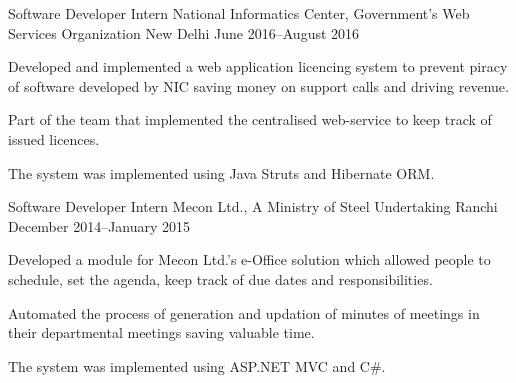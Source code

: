 
\begin{cventries}

\cventry%
  {Software Developer Intern} %
  {National Informatics Center, Government's Web Services Organization} %
  {New Delhi} %
  {June 2016--August 2016} %
  {%
    \begin{cvitems} %
      \item{Developed and implemented a web application licencing system to
            prevent piracy of software developed by NIC saving money on support
            calls and driving revenue.}
      \item{Part of the team that implemented the centralised web-service to
            keep track of issued licences.}
      \item{The system was implemented using Java Struts and Hibernate ORM.}
    \end{cvitems}
  }

\cventry%
  {Software Developer Intern} %
  {Mecon Ltd., A Ministry of Steel Undertaking} %
  {Ranchi} %
  {December 2014--January 2015} %
  {%
    \begin{cvitems} %
      \item{Developed a module for Mecon Ltd.'s e-Office solution which allowed
            people to schedule, set the agenda, keep track of due dates and
            responsibilities.}
      \item{Automated the process of generation and updation of minutes of
            meetings in their departmental meetings saving valuable time.}
      \item{The system was implemented using ASP.NET MVC and C\#.}
    \end{cvitems}
  }

\end{cventries}
